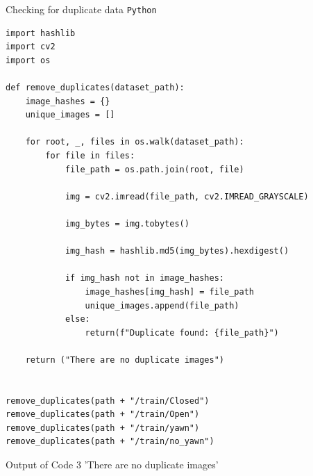 \documentclass{modeleRapport}
\begin{document}
\begin{codebox}{Checking for duplicate data \texttt{Python}}
\begin{verbatim}
import hashlib
import cv2
import os

def remove_duplicates(dataset_path):
    image_hashes = {}
    unique_images = []

    for root, _, files in os.walk(dataset_path):  
        for file in files:
            file_path = os.path.join(root, file)  

            img = cv2.imread(file_path, cv2.IMREAD_GRAYSCALE)

            img_bytes = img.tobytes()

            img_hash = hashlib.md5(img_bytes).hexdigest()

            if img_hash not in image_hashes:
                image_hashes[img_hash] = file_path
                unique_images.append(file_path)
            else:
                return(f"Duplicate found: {file_path}")

    return ("There are no duplicate images")


remove_duplicates(path + "/train/Closed")
remove_duplicates(path + "/train/Open")
remove_duplicates(path + "/train/yawn")
remove_duplicates(path + "/train/no_yawn")
\end{verbatim}
\end{codebox}

\begin{codebox}[OutputB]{ Output of Code 3}
'There are no duplicate images'
\end{codebox}
\end{document}
